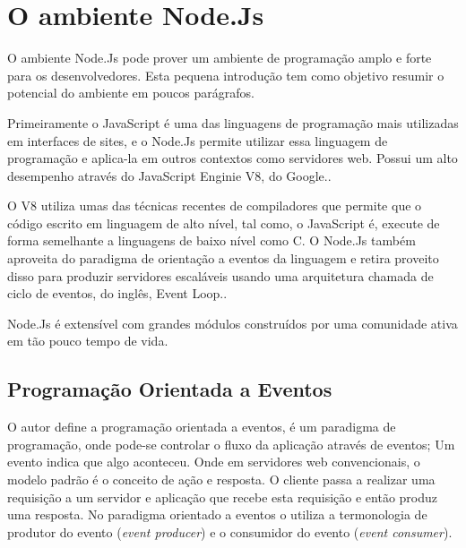\chapter{O ambiente Node.Js}
\label{ambiente-node-js}

\vspace{-1.9cm}


  O ambiente Node.Js pode prover um ambiente de programação amplo e forte para os desenvolvedores. Esta pequena introdução
  tem como objetivo resumir o potencial do ambiente em poucos parágrafos.
  
  
  Primeiramente o JavaScript é uma das linguagens de programação mais utilizadas em interfaces de sites, e o Node.Js
  permite utilizar essa linguagem de programação e aplica-la em outros contextos como servidores web. Possui um alto
  desempenho através do JavaScript Enginie V8, do Google.\cite{Hughes:2012}.
  
  O V8 utiliza umas das técnicas recentes de compiladores que permite que o código escrito em linguagem de alto nível,
  tal como, o JavaScript é, execute de forma semelhante a linguagens de baixo nível como C. O Node.Js também aproveita
  do paradigma de orientação a eventos da linguagem e retira proveito disso para produzir servidores escaláveis usando 
  uma arquitetura chamada de ciclo de eventos, do inglês, Event Loop.\cite{Hughes:2012}.
  
  Node.Js é extensível com grandes módulos construídos por uma comunidade ativa em tão pouco tempo de vida.
  
\section{Programação Orientada a Eventos}
\label{programacao-orientada-a-eventos}

  O autor  define a programação orientada a eventos, é um paradigma de programação, onde
  pode-se controlar o fluxo da aplicação através de eventos; Um evento indica que algo aconteceu. 
  Onde em servidores web convencionais, o modelo padrão é o conceito de ação e resposta. 
  O cliente passa a realizar uma requisição a um servidor e aplicação que recebe esta requisição e então 
  produz uma resposta. No paradigma orientado a eventos o utiliza a termonologia de produtor do evento (\textit{event producer}) 
  e o consumidor do evento (\textit{event consumer}).

